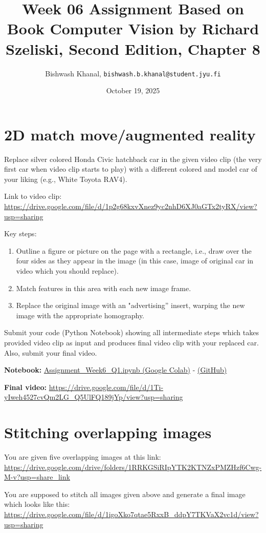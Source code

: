 \documentclass[12pt,a4paper]{article}
\title{Week 06 Assignment Based on Book Computer Vision by Richard Szeliski, Second Edition, Chapter 8}
\author{Bishwash Khanal, \texttt{bishwash.b.khanal@student.jyu.fi}}
\date{October 19, 2025}
\begin{document}
\maketitle

\section{2D match move/augmented reality}
Replace silver colored Honda Civic hatchback car in the given video clip (the very first car when video clip starts to play) with a different 
colored and model car of your liking (e.g., White Toyota RAV4).

Link to video clip: \url{https://drive.google.com/file/d/1p2g68kxvXnez9yc2nhD6XJ0aGTx2tyRX/view?usp=sharing}

Key steps:
\begin{enumerate}
    \item Outline a figure or picture on the page with a rectangle, i.e., draw over the four sides as they appear in the image (in this case, 
    image of original car in video which you should replace).
    \item Match features in this area with each new image frame.
    \item Replace the original image with an "advertising” insert, warping the new image with the appropriate homography.
\end{enumerate}

Submit your code (Python Notebook) showing all intermediate steps which takes provided video clip as input and produces final 
video clip with your replaced car. Also, submit your final video.

\textbf{Notebook:} \href{https://colab.research.google.com/drive/1Yzvp8Du_17CSvvjYdGxLVsR-M0sM8QJU?usp=sharing}{Assignment\_Week6\_Q1.ipynb (Google Colab)} - 
\href{https://github.com/bkhanal-11/ties411_cvip_jyu/blob/master/assignment6/src/Assignment_Week6_Q1.ipynb}{(GitHub)}

\textbf{Final video:} \url{https://drive.google.com/file/d/1Ti-yIweh4527cvQm2LG_Q5UlFQ189jYp/view?usp=sharing}

\section{Stitching overlapping images}
You are given five overlapping images at this link: \url{https://drive.google.com/drive/folders/1RRKGSiRIpYTK2KTNZxPMZHzf6Cwg-M-v?usp=share_link}

You are supposed to stitch all images given above and generate a final image which looks like 
this: \url{https://drive.google.com/file/d/1igoXko7qtae5RxxB_ddpY7TKVaX2vc1d/view?usp=sharing}
\end{document}
